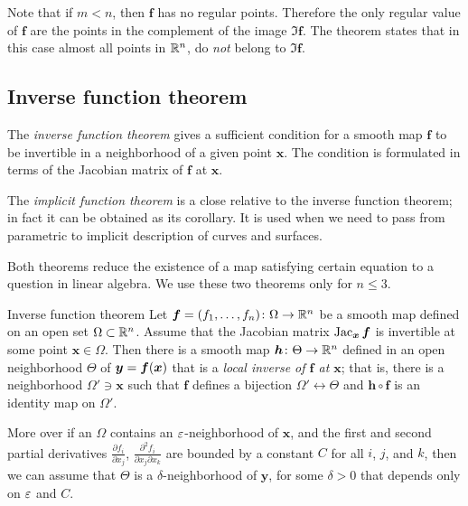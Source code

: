 Note that if $m<n$, then $\bm{f}$ has no regular points.
Therefore the only regular value of $\bm{f}$ are the points in the complement of the image $\Im \bm{f}$.
The theorem states that in this case almost all points in $\mathbb{R}^n$, do {}\emph{not} belong to $\Im \bm{f}$.


\subsection*{Inverse function theorem}

The \emph{inverse function theorem} gives a sufficient condition for a smooth map $\bm{f}$ to be invertible in a neighborhood of a given point $\bm{x}$.
The condition is formulated in terms of the Jacobian matrix of $\bm{f}$ at $\bm{x}$.

The \emph{implicit function theorem} is a close relative to the inverse function theorem;
in fact it can be obtained as its corollary.
It is used when we need to pass from parametric to implicit description of curves and surfaces.

Both theorems reduce the existence of a map satisfying certain equation to a question in linear algebra.
We use these two theorems only for $n\le 3$.

\begin{thm}{Inverse function theorem}\label{thm:inverse}
Let $\bm{f}=(f_1,\dots,f_n)\colon\Omega\to\mathbb{R}^n$ be a smooth map
defined on an open set $\Omega\subset \mathbb{R}^n$.
Assume that the Jacobian matrix
$\mathop{\rm Jac}\nolimits_{\bm{x}}\bm{f}$
is invertible at some point $\bm{x}\in \Omega$.
Then there is a smooth map $\bm{h}\colon\Theta\to\mathbb{R}^n$ defined in an open neighborhood $\Theta$ of ${\bm{y}}\z=\bm{f}(\bm{x})$ that is a {}\emph{local inverse of $\bm{f}$ at $\bm{x}$};
that is, there is a neighborhood $\Omega'\ni \bm{x}$ such that
$\bm{f}$ defines a bijection $\Omega'\leftrightarrow \Theta$ and
$\bm{h} \circ \bm{f}$ is an identity map on $\Omega'$.

More over if an $\Omega$ contains an $\varepsilon$-neighborhood of $\bm{x}$, and the first and second partial derivatives $\tfrac{\partial f_i}{\partial x_j}$, $\tfrac{\partial^2 f_i}{\partial x_j\partial x_k}$ are bounded by a constant $C$ for all $i$, $j$, and $k$, then we can assume that $\Theta$ is a $\delta$-neighborhood of $\bm{y}$, for some $\delta>0$ that depends only on $\varepsilon$ and $C$. 
\end{thm}

